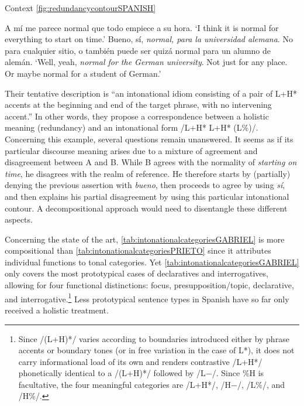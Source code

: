 \begin{exe}
	\ex \label{ex:redundancycontourSPANISH} 
	Context \autoref{fig:redundancycontourSPANISH} \citep[19]{BeckmanETAL.2002}
	\begin{xlist}[A:]
	 A mí me parece normal que todo empiece a su hora. 
	\glt `I think it is normal for everything to start on time.'
	 Bueno, sí, \textit{normal, para la universidad alemana}. No para cualquier sitio, o también puede ser quizá normal para un alumno de alemán.
	\glt `Well, yeah, \textit{normal for the German university}. Not just for any place. Or maybe normal for a student of German.'
	\end{xlist}
\end{exe}

%	


Their tentative description is ``an intonational idiom consisting of a pair of L+H* accents at the beginning and end of the target phrase, with no intervening accent.'' \citep[19]{BeckmanETAL.2002} In other words, they propose a correspondence between a holistic meaning (redundancy) and an intonational form /L+H* L+H* (L\%)/. Concerning this example, several questions remain unanswered. It seems as if its particular discourse meaning arises due to a mixture of agreement and disagreement between A and B. While B agrees with the normality of \textit{starting on time}, he disagrees with the realm of reference. He therefore starts by (partially) denying the previous assertion with \textit{bueno}, then proceeds to agree by using \textit{sí}, and then explains his partial disagreement by using this particular intonational contour. A decompositional approach would need to disentangle these different aspects.\largerpage

Concerning the state of the art, \autoref{tab:intonationalcategoriesGABRIEL} is more compositional than \autoref{tab:intonationalcategoriesPRIETO} since it attributes individual functions to tonal categories. Yet \autoref{tab:intonationalcategoriesGABRIEL} only covers the most prototypical cases of declaratives and interrogatives, allowing for four functional distinctions: focus, presupposition/topic, declarative, and interrogative.\footnote{Since /(L+H)*/ varies according to boundaries introduced either by phrase accents or boundary tones (or in free variation in the case of L*), it does not carry informational load of its own and renders contrastive /L+H*/ phonetically identical to a /(L+H)*/ followed by /L$-$/. Since \%H is facultative, the four meaningful categories are /L+H*/, /H$-$/, /L\%/, and /H\%/.} Less prototypical sentence types in Spanish have so far only received a holistic treatment. 

